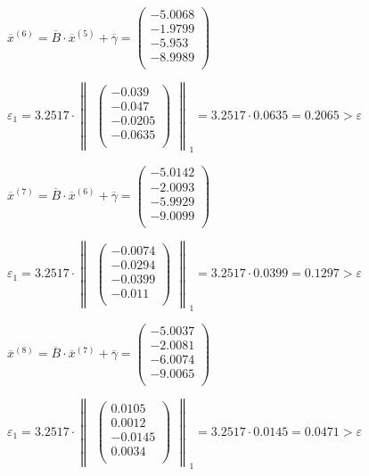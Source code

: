 \documentclass[10pt, a4paper]{scrartcl}
\begin{document}
\(\overline{x}^{(6)} = \overline{B} \cdot \overline{x}^{(5)} + \overline{\gamma} = \begin{pmatrix} -5.0068\\ -1.9799\\ -5.953\\ -8.9989\\ \end{pmatrix}\)

\(\varepsilon_1 = 3.2517 \cdot \begin{Vmatrix}\begin{pmatrix} -0.039\\ -0.047\\ -0.0205\\ -0.0635\\ \end{pmatrix}\end{Vmatrix} _1 = 3.2517 \cdot 0.0635 = 0.2065 > \varepsilon\)

\(\overline{x}^{(7)} = \overline{B} \cdot \overline{x}^{(6)} + \overline{\gamma} = \begin{pmatrix} -5.0142\\ -2.0093\\ -5.9929\\ -9.0099\\ \end{pmatrix}\)

\(\varepsilon_1 = 3.2517 \cdot \begin{Vmatrix}\begin{pmatrix} -0.0074\\ -0.0294\\ -0.0399\\ -0.011\\ \end{pmatrix}\end{Vmatrix} _1 = 3.2517 \cdot 0.0399 = 0.1297 > \varepsilon\)

\(\overline{x}^{(8)} = \overline{B} \cdot \overline{x}^{(7)} + \overline{\gamma} = \begin{pmatrix} -5.0037\\ -2.0081\\ -6.0074\\ -9.0065\\ \end{pmatrix}\)

\(\varepsilon_1 = 3.2517 \cdot \begin{Vmatrix}\begin{pmatrix} 0.0105\\ 0.0012\\ -0.0145\\ 0.0034\\ \end{pmatrix}\end{Vmatrix} _1 = 3.2517 \cdot 0.0145 = 0.0471 > \varepsilon\)
\end{document}
